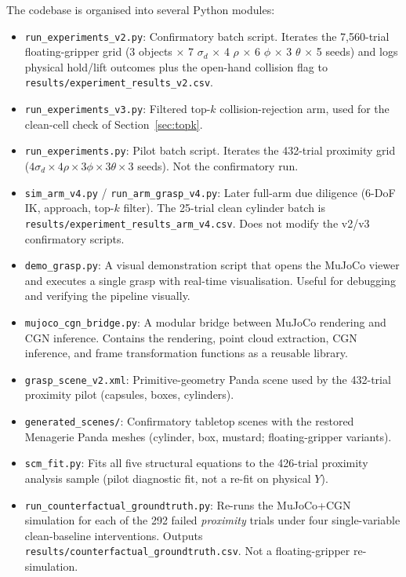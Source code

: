 \documentclass[11pt,a4paper]{report}
\begin{document}
The codebase is organised into several Python modules:

\begin{itemize}
  \item \texttt{run\_experiments\_v2.py}: Confirmatory batch script. Iterates the 7{,}560-trial floating-gripper grid (3 objects $\times$ 7 $\sigma_d$ $\times$ 4 $\rho$ $\times$ 6 $\phi$ $\times$ 3 $\theta$ $\times$ 5 seeds) and logs physical hold/lift outcomes plus the open-hand collision flag to \texttt{results/experiment\_results\_v2.csv}.

  \item \texttt{run\_experiments\_v3.py}: Filtered top-$k$ collision-rejection arm, used for the clean-cell check of Section~\ref{sec:topk}.

  \item \texttt{run\_experiments.py}: Pilot batch script. Iterates the 432-trial proximity grid ($4 \sigma_d \times 4 \rho \times 3 \phi \times 3 \theta \times 3$ seeds). Not the confirmatory run.

  \item \texttt{sim\_arm\_v4.py} / \texttt{run\_arm\_grasp\_v4.py}: Later full-arm due diligence (6-DoF IK, approach, top-$k$ filter). The 25-trial clean cylinder batch is \texttt{results/experiment\_results\_arm\_v4.csv}. Does not modify the v2/v3 confirmatory scripts.

  \item \texttt{demo\_grasp.py}: A visual demonstration script that opens the MuJoCo viewer and executes a single grasp with real-time visualisation. Useful for debugging and verifying the pipeline visually.

  \item \texttt{mujoco\_cgn\_bridge.py}: A modular bridge between MuJoCo rendering and CGN inference. Contains the rendering, point cloud extraction, CGN inference, and frame transformation functions as a reusable library.

  \item \texttt{grasp\_scene\_v2.xml}: Primitive-geometry Panda scene used by the 432-trial proximity pilot (capsules, boxes, cylinders).

  \item \texttt{generated\_scenes/}: Confirmatory tabletop scenes with the restored Menagerie Panda meshes (cylinder, box, mustard; floating-gripper variants).

  \item \texttt{scm\_fit.py}: Fits all five structural equations to the 426-trial proximity analysis sample (pilot diagnostic fit, not a re-fit on physical $Y$).

  \item \texttt{run\_counterfactual\_groundtruth.py}: Re-runs the MuJoCo+CGN simulation for each of the 292 failed \emph{proximity} trials under four single-variable clean-baseline interventions. Outputs \texttt{results/counterfactual\_groundtruth.csv}. Not a floating-gripper re-simulation.
\end{itemize}
\end{document}
